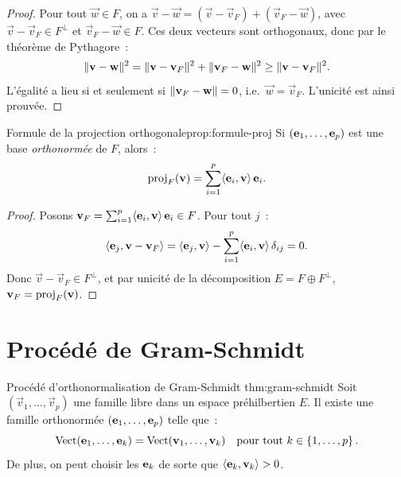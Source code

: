 \begin{proof}
  Pour tout $\vec{w}\in F$, on a
  $\vec{v}-\vec{w}=(\vec{v}-\vec{v}_F)+(\vec{v}_F-\vec{w})$, avec
  $\vec{v}-\vec{v}_F\in F^\perp$ et
  $\vec{v}_F-\vec{w}\in F$. Ces deux vecteurs sont orthogonaux, donc
  par le théorème de Pythagore~:
  \[
    \lVert\mathbf{v}-\mathbf{w}\rVert^2
    =\lVert\mathbf{v}-\mathbf{v}_F\rVert^2+\lVert\mathbf{v}_F-\mathbf{w}\rVert^2
    \geq\lVert\mathbf{v}-\mathbf{v}_F\rVert^2.
  \]
  L'égalité a lieu si et seulement si
  $\lVert\mathbf{v}_F-\mathbf{w}\rVert=0$, i.e.\ $\vec{w}=\vec{v}_F$.
  L'unicité est ainsi prouvée.
\end{proof}

\begin{proposition}{Formule de la projection orthogonale}{prop:formule-proj}
  Si $(\mathbf{e}_{1},\ldots,\mathbf{e}_{p})$ est une base \emph{orthonormée}
  de $F$, alors~:
  \[
    \operatorname{proj}_F(\mathbf{v})
    =\sum_{i=1}^p\langle\mathbf{e}_{i},\mathbf{v}\rangle\,\mathbf{e}_{i}.
  \]
\end{proposition}

\begin{proof}
  Posons $\mathbf{v}_F=\sum_{i=1}^p\langle\mathbf{e}_{i},\mathbf{v}\rangle\,\mathbf{e}_{i}
  \in F$. Pour tout $j$~:
  \[
    \langle\mathbf{e}_{j},\mathbf{v}-\mathbf{v}_F\rangle
    =\langle\mathbf{e}_{j},\mathbf{v}\rangle
    -\sum_{i=1}^p\langle\mathbf{e}_{i},\mathbf{v}\rangle\,\delta_{ij}
    =0.
  \]
  Donc $\vec{v}-\vec{v}_F\in F^\perp$, et par unicité de la
  décomposition $E=F\oplus F^\perp$, $\mathbf{v}_F=\operatorname{proj}_F(\mathbf{v})$.
\end{proof}

\section{Procédé de Gram-Schmidt}\label{sec:gram-schmidt}

\begin{theorem}{Procédé d'orthonormalisation de Gram-Schmidt}%
{thm:gram-schmidt}
  Soit $(\vec{v}_1,\ldots,\vec{v}_p)$ une famille libre dans un espace
  préhilbertien $E$. Il existe une famille orthonormée
  $(\mathbf{e}_{1},\ldots,\mathbf{e}_{p})$ telle que~:
  \[
    \operatorname{Vect}(\mathbf{e}_{1},\ldots,\mathbf{e}_{k})
    =\operatorname{Vect}(\mathbf{v}_1,\ldots,\mathbf{v}_k)
    \quad\text{pour tout }k\in\left\{1,\ldots,p\right\}.
  \]
  De plus, on peut choisir les $\mathbf{e}_{k}$ de sorte que
  $\langle\mathbf{e}_{k},\mathbf{v}_k\rangle>0$.
\end{theorem}

